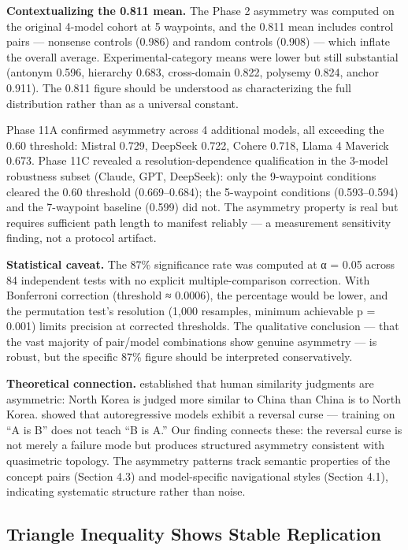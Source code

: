 \textbf{Contextualizing the 0.811 mean.} The Phase 2 asymmetry was computed on the original 4-model cohort at 5 waypoints, and the 0.811 mean includes control pairs --- nonsense controls (0.986) and random controls (0.908) --- which inflate the overall average. Experimental-category means were lower but still substantial (antonym 0.596, hierarchy 0.683, cross-domain 0.822, polysemy 0.824, anchor 0.911). The 0.811 figure should be understood as characterizing the full distribution rather than as a universal constant.

Phase 11A confirmed asymmetry across 4 additional models, all exceeding the 0.60 threshold: Mistral 0.729, DeepSeek 0.722, Cohere 0.718, Llama 4 Maverick 0.673. Phase 11C revealed a resolution-dependence qualification in the 3-model robustness subset (Claude, GPT, DeepSeek): only the 9-waypoint conditions cleared the 0.60 threshold (0.669--0.684); the 5-waypoint conditions (0.593--0.594) and the 7-waypoint baseline (0.599) did not. The asymmetry property is real but requires sufficient path length to manifest reliably --- a measurement sensitivity finding, not a protocol artifact.

\textbf{Statistical caveat.} The 87\% significance rate was computed at α = 0.05 across 84 independent tests with no explicit multiple-comparison correction. With Bonferroni correction (threshold ≈ 0.0006), the percentage would be lower, and the permutation test's resolution (1,000 resamples, minimum achievable p = 0.001) limits precision at corrected thresholds. The qualitative conclusion --- that the vast majority of pair/model combinations show genuine asymmetry --- is robust, but the specific 87\% figure should be interpreted conservatively.

\textbf{Theoretical connection.} \citet{tversky1977features} established that human similarity judgments are asymmetric: North Korea is judged more similar to China than China is to North Korea. \citet{berglund2024reversal} showed that autoregressive models exhibit a reversal curse --- training on ``A is B'' does not teach ``B is A.'' Our finding connects these: the reversal curse is not merely a failure mode but produces structured asymmetry consistent with quasimetric topology. The asymmetry patterns track semantic properties of the concept pairs (Section 4.3) and model-specific navigational styles (Section 4.1), indicating systematic structure rather than noise.

\subsection{Triangle Inequality Shows Stable Replication}\label{triangle-inequality-shows-stable-replication}

